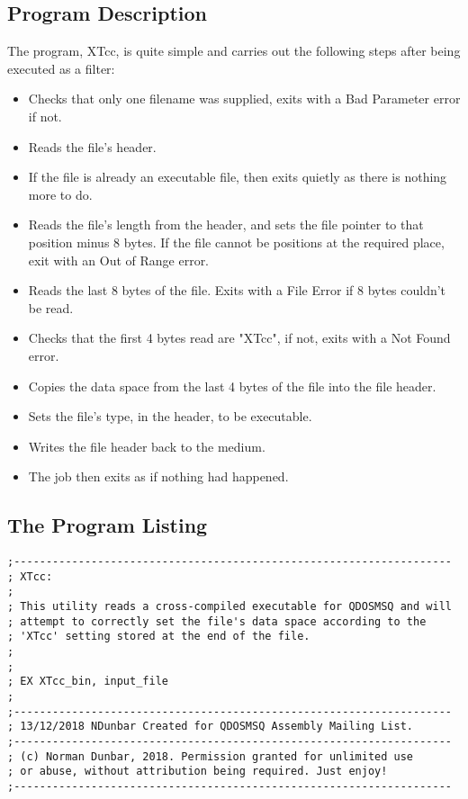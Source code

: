 \subsection{Program Description}

The program, XTcc, is quite simple and carries out the following steps after being executed as a filter:

\begin{itemize}
	\item Checks that only one filename was supplied, exits with a Bad Parameter error if not.
	\item Reads the file's header.
	\item If the file is already an executable file, then exits quietly as there is nothing more to do.
	\item Reads the file's length from the header, and sets the file pointer to that position minus 8 bytes. If the file cannot be positions at the required place, exit with an Out of Range error.
	\item Reads the last 8 bytes of the file. Exits with a File Error if 8 bytes couldn't be read.
	\item Checks that the first 4 bytes read are "XTcc", if not, exits with a Not Found error.
	\item Copies the data space from the last 4 bytes of the file into the file header.
	\item Sets the file's type, in the header, to be executable.
	\item Writes the file header back to the medium.
	\item The job then exits as if nothing had happened.
\end{itemize}


\subsection{The Program Listing}


\begin{lstlisting}[firstnumber=1,caption={XTcc - Comments}]
;--------------------------------------------------------------------
; XTcc:
;
; This utility reads a cross-compiled executable for QDOSMSQ and will
; attempt to correctly set the file's data space according to the
; 'XTcc' setting stored at the end of the file.
;
;
; EX XTcc_bin, input_file
;
;--------------------------------------------------------------------
; 13/12/2018 NDunbar Created for QDOSMSQ Assembly Mailing List.
;--------------------------------------------------------------------
; (c) Norman Dunbar, 2018. Permission granted for unlimited use
; or abuse, without attribution being required. Just enjoy!
;--------------------------------------------------------------------
\end{lstlisting}


